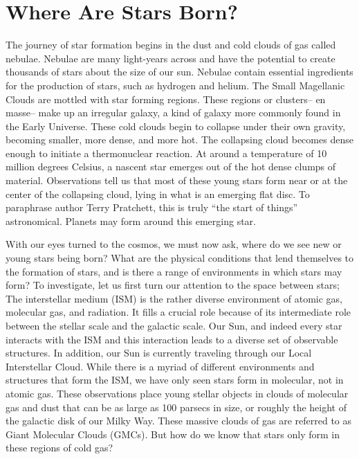 \documentclass[../dissertation.tex]{subfiles}
\begin{document}
\section{Where Are Stars Born?}


The journey of star formation begins in the dust and cold clouds of gas called nebulae. Nebulae are many light-years across and have the potential to create thousands of stars about the size of our sun. Nebulae contain essential ingredients for the production of stars, such as hydrogen and helium. The Small Magellanic Clouds are mottled with star forming regions. These regions or clusters-- en masse-- make up an irregular galaxy, a kind of galaxy more commonly found in the Early Universe. These cold clouds begin to collapse under their own gravity, becoming smaller, more dense, and more hot. The collapsing cloud becomes dense enough to initiate a thermonuclear reaction. At around a temperature of 10 million degrees Celsius, a nascent star emerges out of the hot dense clumps of material. Observations tell us that most of these young stars form near or at the center of the collapsing cloud, lying in what is an emerging flat disc. To paraphrase author Terry Pratchett, this is truly ``the start of things'' astronomical. Planets may form around this emerging star.

With our eyes turned to the cosmos, we must now ask, where do we see new or young stars being born? 
What are the physical conditions that lend themselves to the formation of stars, 
and is there a range of environments in which stars may form?
To investigate, let us first turn our attention to the space between stars;  
The interstellar medium (ISM) is the rather diverse environment of atomic gas, molecular gas, and radiation. 
It fills a crucial role because of its intermediate role between the stellar scale and the galactic scale. 
Our Sun, and indeed every star interacts with the ISM and this interaction leads to a diverse set of observable structures. 
In addition, our Sun is currently traveling through our Local Interstellar Cloud. 
While there is a myriad of different environments and structures that form the ISM, we have only seen stars form in molecular, not in atomic gas. 
These observations place young stellar objects in clouds of molecular gas and dust that can be 
as large as 100 parsecs in size, or roughly the height of the galactic disk of our Milky Way. 
These massive clouds of gas are referred to as Giant Molecular Clouds (GMCs). 
But how do we know that stars only form in these regions of cold gas?
\end{document}
